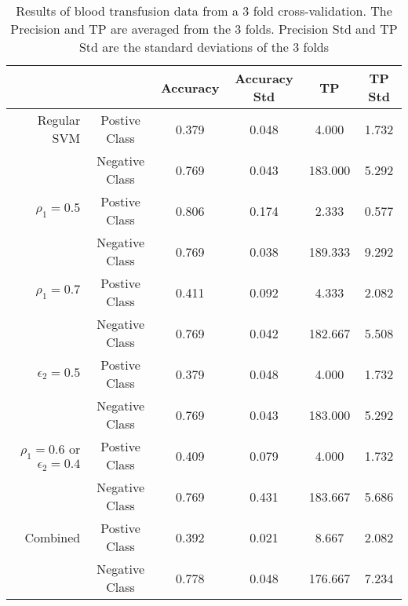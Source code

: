 \begin{table}[htp]
\begin{tabular}{rc|cccc}
\hline
           &            & Accuracy  & Accuracy Std &          TP &      TP Std \\
\hline
\hline
Regular SVM & Postive Class &      0.379 &      0.048 &      4.000 &      1.732 \\

           & Negative Class &      0.769 &      0.043 &    183.000 &      5.292 \\
\hline
    $\rho_1=0.5$ & Postive Class &      0.806 &      0.174 &      2.333 &      0.577 \\

           & Negative Class &      0.769 &      0.038 &    189.333 &      9.292 \\
\hline
    $\rho_1=0.7$ & Postive Class &      0.411 &      0.092 &      4.333 &      2.082 \\

           & Negative Class &      0.769 &      0.042 &    182.667 &      5.508 \\
\hline
    $\epsilon_2=0.5$ & Postive Class &      0.379 &      0.048 &      4.000 &      1.732 \\

           & Negative Class &      0.769 &      0.043 &    183.000 &      5.292 \\
\hline
$\rho_1=0.6$ or $\epsilon_2=0.4$ & Postive Class &      0.409 &      0.079 &      4.000 &      1.732 \\

           & Negative Class &      0.769 &      0.431 &    183.667 &      5.686 \\
\hline
  Combined & Postive Class &      0.392 &      0.021 &      8.667 &      2.082 \\

           & Negative Class &      0.778 &      0.048 &    176.667 &      7.234 \\
\hline
\hline
\end{tabular}
\caption{Results of blood transfusion data from a 3 fold cross-validation. The Precision and TP are averaged from the 3 folds. Precision Std and TP Std are the standard deviations of the 3 folds}
\label{bloodtransfusion}
\end{table}


